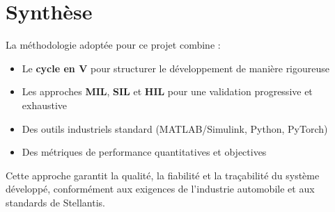 \section{Synthèse}

La méthodologie adoptée pour ce projet combine :
\begin{itemize}
    \item Le \textbf{cycle en V} pour structurer le développement de manière rigoureuse
    \item Les approches \textbf{MIL}, \textbf{SIL} et \textbf{HIL} pour une validation progressive et exhaustive
    \item Des outils industriels standard (MATLAB/Simulink, Python, PyTorch)
    \item Des métriques de performance quantitatives et objectives
\end{itemize}

Cette approche garantit la qualité, la fiabilité et la traçabilité du système développé, conformément aux exigences de l'industrie automobile et aux standards de Stellantis.
